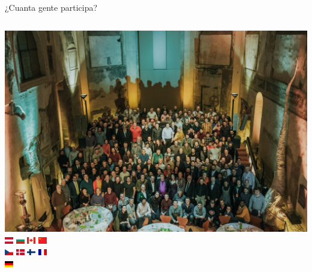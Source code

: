 \begin{frame}[t]{¿Cuanta gente participa?}
\vspace{-1em}
\begin{columns}
\includegraphics[height=.9\textheight]{img/full-committee-prague.jpg}
\includegraphics[width=1em]{img/flags/at.jpg}
\includegraphics[width=1em]{img/flags/bg.jpg}
\includegraphics[width=1em]{img/flags/ca.jpg}
\includegraphics[width=1em]{img/flags/cn.jpg}
\\
\includegraphics[width=1em]{img/flags/cz.jpg}
\includegraphics[width=1em]{img/flags/dk.jpg}
\includegraphics[width=1em]{img/flags/fi.jpg}
\includegraphics[width=1em]{img/flags/fr.jpg}
\\
\includegraphics[width=1em]{img/flags/de.jpg}

\end{columns}
\end{frame}
